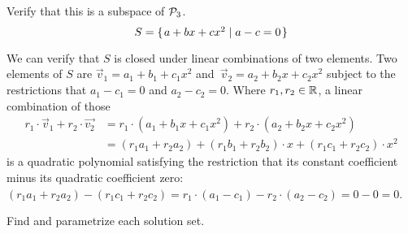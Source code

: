\documentclass[11pt,answers]{examjh}
\begin{document}
\begin{questions}
\question
Verify that this is a subspace of $\mathcal{P}_3$.
\begin{equation*}
  S=\mbox{$\{\hspace{0.1em}a+bx+cx^2\mid a-c=0\hspace{0.1em}\}$}
\end{equation*}
\begin{solution}[2in]
We can verify that $S$ is closed under linear combinations of two elements.
Two elements of $S$ are $\vec{v}_1=a_1+b_1+c_1x^2$
and~$\vec{v}_2=a_2+b_2x+c_2x^2$
subject to the restrictions that $a_1-c_1=0$ and $a_2-c_2=0$.
Where $r_1,r_2\in\mathbb{R}$, a linear combination of those
\begin{align*}
  r_1\cdot\vec{v}_1+r_2\cdot\vec{v_2}
  &=r_1\cdot (a_1+b_1x+c_1x^2)+r_2\cdot (a_2+b_2x+c_2x^2) \\
  &=(r_1a_1+r_2a_2)+(r_1b_1+r_2b_2)\cdot x+(r_1c_1+r_2c_2)\cdot x^2
\end{align*}
is a quadratic polynomial satisfying the restriction that its
constant coefficient minus its quadratic coefficient zero:
$(r_1a_1+r_2a_2)-(r_1c_1+r_2c_2)=r_1\cdot(a_1-c_1)-r_2\cdot(a_2-c_2)=0-0=0$.
\end{solution}



\question
Find and parametrize each solution set.
\begin{parts}

\end{parts}
\end{questions}
\end{document}
